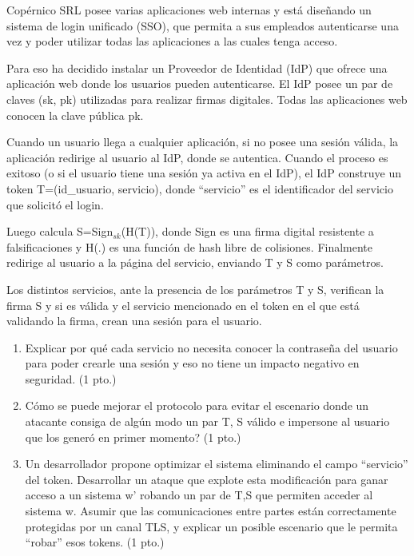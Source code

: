 \begin{consigna}
Copérnico SRL posee varias aplicaciones web internas y está diseñando un sistema de login
unificado (SSO), que permita a sus empleados autenticarse una vez y poder utilizar todas las
aplicaciones a las cuales tenga acceso.

Para eso ha decidido instalar un Proveedor de Identidad (IdP) que ofrece una aplicación web
donde los usuarios pueden autenticarse. El IdP posee un par de claves (sk, pk) utilizadas
para realizar firmas digitales. Todas las aplicaciones web conocen la clave pública pk.

Cuando un usuario llega a cualquier aplicación, si no posee una sesión válida, la aplicación
redirige al usuario al IdP, donde se autentica. Cuando el proceso es exitoso (o si el usuario
tiene una sesión ya activa en el IdP), el IdP construye un token T=(id\_usuario, servicio),
donde ``servicio'' es el identificador del servicio que solicitó el login.

Luego calcula S=Sign$_{sk}$(H(T)), donde Sign es una firma digital resistente a
falsificaciones y H(.) es una función de hash libre de colisiones. Finalmente redirige al
usuario a la página del servicio, enviando T y S como parámetros.

Los distintos servicios, ante la presencia de los parámetros T y S, verifican la firma S y si
es válida y el servicio mencionado en el token en el que está validando la firma, crean una
sesión para el usuario.

\begin{enumerate}
  \item[a)] Explicar por qué cada servicio no necesita conocer la contraseña del usuario para
  poder crearle una sesión y eso no tiene un impacto negativo en seguridad. (1 pto.)
  \item[b)] \textquestiondown{}Cómo se puede mejorar el protocolo para evitar el escenario donde un atacante
  consiga de algún modo un par T, S válido e impersone al usuario que los generó en primer
  momento? (1 pto.)
  \item[c)] Un desarrollador propone optimizar el sistema eliminando el campo ``servicio'' del
  token. Desarrollar un ataque que explote esta modificación para ganar acceso a un sistema
  w' robando un par de T,S que permiten acceder al sistema w. Asumir que las comunicaciones
  entre partes están correctamente protegidas por un canal TLS, y explicar un posible
  escenario que le permita ``robar'' esos tokens. (1 pto.)
\end{enumerate}
\end{consigna}

